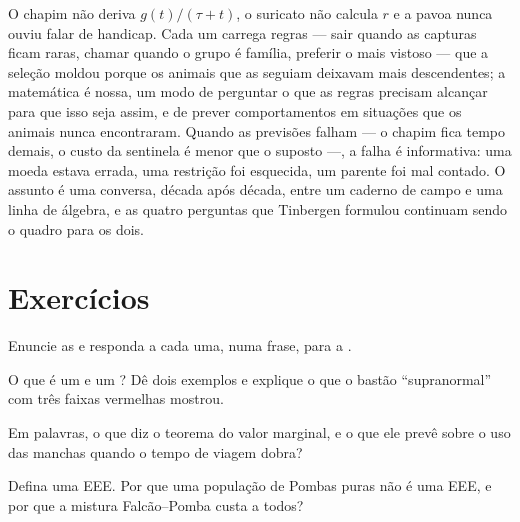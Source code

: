 \begin{remark}\label{rem:b3:behavioural-ecology:remark}
O chapim não deriva $g(t)/(\tau + t)$, o suricato não calcula $r$ e a
pavoa nunca ouviu falar de handicap. Cada um carrega regras --- sair
quando as capturas ficam raras, chamar quando o grupo é família,
preferir o mais vistoso --- que a seleção moldou porque os animais que as
seguiam deixavam mais descendentes; a matemática é nossa, um modo de
perguntar o que as regras precisam alcançar para que isso seja assim, e
de prever comportamentos em situações que os animais nunca encontraram.
Quando as previsões falham --- o chapim fica tempo demais, o custo da
sentinela é menor que o suposto ---, a falha é informativa: uma moeda
estava errada, uma restrição foi esquecida, um parente foi mal contado. O
assunto é uma conversa, década após década, entre um caderno de campo e
uma linha de álgebra, e as quatro perguntas que Tinbergen formulou
continuam sendo o quadro para os dois.
\end{remark}

\section{Exercícios}

\begin{exercise}[$\star$]\label{exo:b3:behavioural-ecology:1}
Enuncie as  e responda a cada uma, numa
frase, para a .
\end{exercise}

\begin{exercise}[$\star$]\label{exo:b3:behavioural-ecology:2}
O que é um  e um ? Dê dois exemplos e
explique o que o bastão ``supranormal'' com três faixas vermelhas
mostrou.
\end{exercise}

\begin{exercise}[$\star$]\label{exo:b3:behavioural-ecology:3}
Em palavras, o que diz o teorema do valor marginal, e o que ele prevê
sobre o uso das manchas quando o tempo de viagem dobra?
\end{exercise}

\begin{exercise}[$\star$]\label{exo:b3:behavioural-ecology:4}
Defina uma EEE. Por que uma população de Pombas puras não é uma EEE, e
por que a mistura Falcão--Pomba custa a todos?
\end{exercise}

